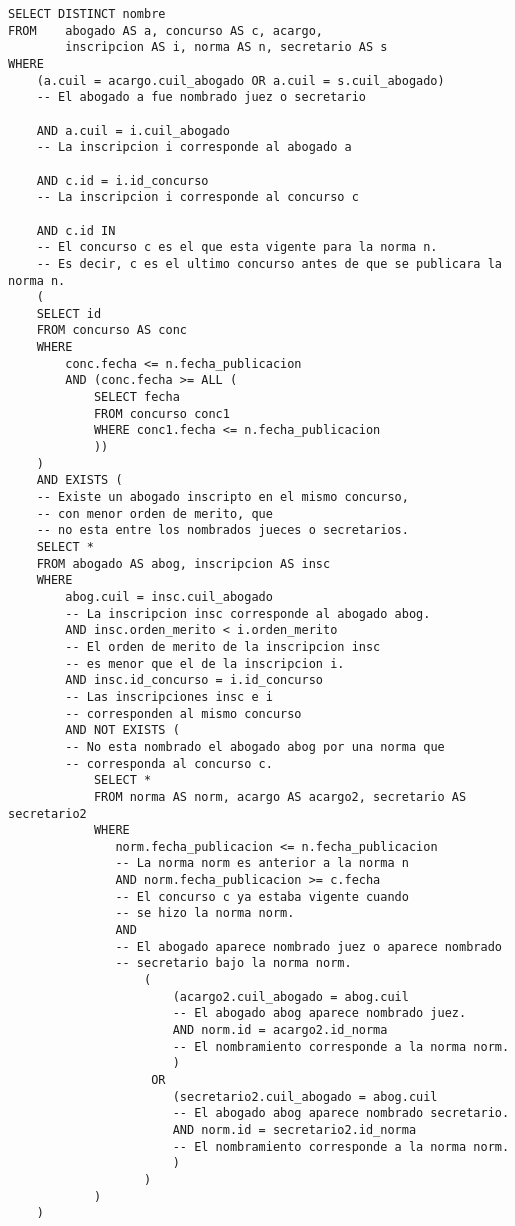 \begin{verbatim}
SELECT DISTINCT nombre
FROM    abogado AS a, concurso AS c, acargo, 
        inscripcion AS i, norma AS n, secretario AS s
WHERE   
    (a.cuil = acargo.cuil_abogado OR a.cuil = s.cuil_abogado) 
    -- El abogado a fue nombrado juez o secretario

    AND a.cuil = i.cuil_abogado 
    -- La inscripcion i corresponde al abogado a

    AND c.id = i.id_concurso  
    -- La inscripcion i corresponde al concurso c

    AND c.id IN 
    -- El concurso c es el que esta vigente para la norma n.
    -- Es decir, c es el ultimo concurso antes de que se publicara la norma n.
    (
    SELECT id
    FROM concurso AS conc
    WHERE   
        conc.fecha <= n.fecha_publicacion
        AND (conc.fecha >= ALL (
            SELECT fecha
            FROM concurso conc1
            WHERE conc1.fecha <= n.fecha_publicacion
            ))
    )
    AND EXISTS (    
    -- Existe un abogado inscripto en el mismo concurso,  
    -- con menor orden de merito, que
    -- no esta entre los nombrados jueces o secretarios.
    SELECT *
    FROM abogado AS abog, inscripcion AS insc
    WHERE   
        abog.cuil = insc.cuil_abogado 
        -- La inscripcion insc corresponde al abogado abog.
        AND insc.orden_merito < i.orden_merito  
        -- El orden de merito de la inscripcion insc
        -- es menor que el de la inscripcion i.
        AND insc.id_concurso = i.id_concurso    
        -- Las inscripciones insc e i 
        -- corresponden al mismo concurso
        AND NOT EXISTS (    
        -- No esta nombrado el abogado abog por una norma que 
        -- corresponda al concurso c.
            SELECT *
            FROM norma AS norm, acargo AS acargo2, secretario AS secretario2
            WHERE  
               norm.fecha_publicacion <= n.fecha_publicacion 
               -- La norma norm es anterior a la norma n
               AND norm.fecha_publicacion >= c.fecha    
               -- El concurso c ya estaba vigente cuando 
               -- se hizo la norma norm.
               AND 
               -- El abogado aparece nombrado juez o aparece nombrado 
               -- secretario bajo la norma norm.
                   (
                       (acargo2.cuil_abogado = abog.cuil 
                       -- El abogado abog aparece nombrado juez.
                       AND norm.id = acargo2.id_norma 
                       -- El nombramiento corresponde a la norma norm.
                       ) 
                    OR 
                       (secretario2.cuil_abogado = abog.cuil 
                       -- El abogado abog aparece nombrado secretario.
                       AND norm.id = secretario2.id_norma 
                       -- El nombramiento corresponde a la norma norm.
                       ) 
                   )
            )
    )
\end{verbatim}

